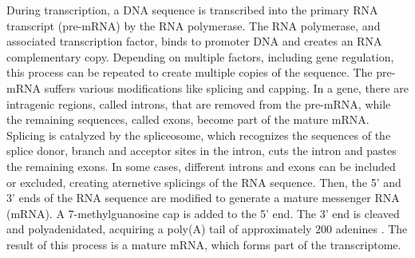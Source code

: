 During transcription, a DNA sequence is transcribed into the primary RNA transcript (pre-mRNA) by the RNA polymerase. 
The RNA polymerase, and associated transcription factor, binds to promoter DNA and creates an RNA complementary copy. 
Depending on multiple factors, including gene regulation, this process can be repeated to create multiple copies of the sequence\citep{alberts2014molecular}.
The pre-mRNA suffers various modifications like splicing and capping. 
In a gene, there are  intragenic regions, called introns, that are removed from the pre-mRNA, while the remaining sequences, called exons, become part of the mature mRNA. 
Splicing is catalyzed by the spliceosome, which recognizes the sequences of the splice donor, branch and acceptor sites in the intron, cuts the intron and pastes the remaining exons.
In some cases, different introns and exons can be included or excluded, creating aternetive splicings of the RNA sequence\citep{alberts2014molecular}. 
Then, the 5' and 3' ends of the RNA sequence are modified to generate a mature messenger RNA (mRNA). 
A 7-methylguanosine cap is added to the 5' end. The 3' end is cleaved and polyadenidated, acquiring a poly(A) tail of approximately 200 adenines \citep{alberts2014molecular}. 
The result of this process is a mature mRNA, which forms part of the transcriptome.



